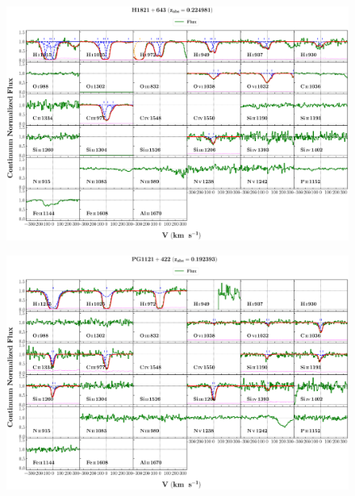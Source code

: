 \documentclass[12pt]{report}
\begin{document}
\begin{landscape}

    \begin{figure}
        \centering
        \vspace{-20mm}
        \hspace*{-35mm}
        \includegraphics[width=1.25\linewidth]{sys_plots_full/H1821+643_z=0.224981_sys_plot_full.png}
    \end{figure}
    
\end{landscape}


\begin{landscape}

    \begin{figure}
        \centering
        \vspace{-20mm}
        \hspace*{-35mm}
        \includegraphics[width=1.25\linewidth]{sys_plots_full/PG1121+422_z=0.192393_sys_plot_full.png}
    \end{figure}
    
\end{landscape}
\end{document}
